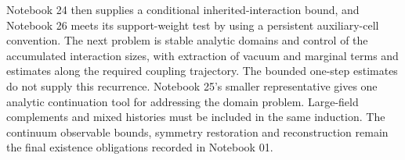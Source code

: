 Notebook 24 then supplies a conditional inherited-interaction
bound, and Notebook 26 meets its support-weight test by using
a persistent auxiliary-cell convention. The next problem is
stable analytic domains and control of the accumulated
interaction sizes, with extraction of vacuum and marginal
terms and estimates along the required coupling trajectory.
The bounded one-step estimates do not supply this recurrence.
Notebook 25's smaller representative gives one analytic
continuation tool for addressing the domain problem.
Large-field complements and mixed histories must be included
in the same induction. The continuum observable bounds,
symmetry restoration and reconstruction remain the final
existence obligations recorded in Notebook 01.
